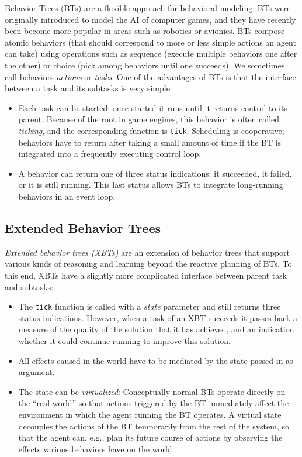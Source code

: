 \documentclass[a4wide]{article}
\begin{document}
Behavior Trees (BTs) are a flexible approach for behavioral
modeling.  BTs were originally introduced to model the AI of
computer games, and they have recently been become more popular in
areas such as robotics or avionics.  BTs compose atomic behaviors
(that should correspond to more or less simple actions an agent can
take) using operations such as sequence (execute multiple behaviors
one after the other) or choice (pick among behaviors until one
succeeds).  We sometimes call behaviors \emph{actions} or \emph{tasks}.  One
of the advantages of BTs is that the interface between a task and
its subtasks is very simple:

\begin{itemize}
\item Each task can be started; once started it runs until it returns
control to its parent.  Because of the root in game engines, this
behavior is often called \emph{ticking}, and the corresponding function
is \verb~tick~.  Scheduling is cooperative; behaviors have to return
after taking a small amount of time if the BT is integrated into a
frequently executing control loop.

\item A behavior can return one of three status indications: it
succeeded, it failed, or it is still running.  This last status
allows BTs to integrate long-running behaviors in an event loop.
\end{itemize}

\subsection{Extended Behavior Trees}
\label{sec-2-1}

\emph{Extended behavior trees (XBTs)} are an extension of behavior trees
that support various kinds of reasoning and learning beyond the
reactive planning of BTs.  To this end, XBTs have a slightly more
complicated interface between parent task and subtasks:

\begin{itemize}
\item The \verb~tick~ function is called with a \emph{state} parameter and still
returns three status indications.  However, when a task of an XBT
succeeds it passes back a measure of the quality of the solution
that it has achieved, and an indication whether it could continue
running to improve this solution.

\item All effects caused in the world have to be mediated by the state
passed in as argument.

\item The state can be \emph{virtualized}: Conceptually normal BTs operate
directly on the ``real world'' so that actions triggered by the
BT immediately affect the environment in which the agent running
the BT operates.  A virtual state decouples the actions of the BT
temporarily from the rest of the system, so that the agent can,
e.g., plan its future course of actions by observing the effects
various behaviors have on the world.
\end{itemize}
\end{document}
